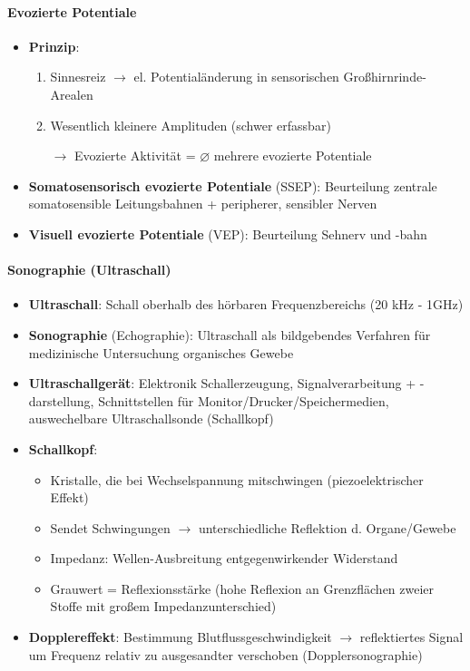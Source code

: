 \paragraph{Evozierte Potentiale}
\begin{itemize}
  \item \textbf{Prinzip}:
  \begin{enumerate}
    \item Sinnesreiz \( \to \) el. Potentialänderung in sensorischen Großhirnrinde-Arealen
    \item Wesentlich kleinere Amplituden (schwer erfassbar)
    \item[\( \to \)] Evozierte Aktivität = \( \varnothing \) mehrere evozierte Potentiale
  \end{enumerate}
  \item \textbf{Somatosensorisch evozierte Potentiale} (SSEP): Beurteilung zentrale somatosensible Leitungsbahnen + peripherer, sensibler Nerven
  \item \textbf{Visuell evozierte Potentiale} (VEP): Beurteilung Sehnerv und -bahn
\end{itemize}

\paragraph{Sonographie (Ultraschall)}
\begin{itemize}
  \item \textbf{Ultraschall}: Schall oberhalb des hörbaren Frequenzbereichs (20 kHz - 1GHz)
  \item \textbf{Sonographie} (Echographie): Ultraschall als bildgebendes Verfahren für medizinische Untersuchung organisches Gewebe
  \item \textbf{Ultraschallgerät}: Elektronik Schallerzeugung, Signalverarbeitung + -dar\-stel\-lung, Schnittstellen für Monitor/Drucker/Speichermedien, auswechelbare Ultraschallsonde (Schallkopf)
  \item \textbf{Schallkopf}:
  \begin{itemize}
    \item Kristalle, die bei Wechselspannung mitschwingen (piezoelektrischer Effekt)
    \item Sendet Schwingungen \( \to \) unterschiedliche Reflektion d. Organe/Gewebe
    \item Impedanz: Wellen-Ausbreitung entgegenwirkender Widerstand
    \item Grauwert = Reflexionsstärke (hohe Reflexion an Grenzflächen zweier Stoffe mit großem Impedanzunterschied)
  \end{itemize}
  \item \textbf{Dopplereffekt}: Bestimmung Blutflussgeschwindigkeit \( \to \) reflektiertes Signal um Frequenz relativ zu ausgesandter verschoben (Dopplersonographie)
\end{itemize}

